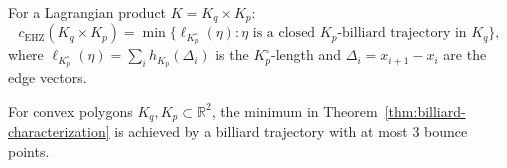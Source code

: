 \begin{unverified}
\begin{theorem}%
\label{thm:billiard-characterization}
For a Lagrangian product $K = K_q \times K_p$:
\[
  c_{\mathrm{EHZ}}(K_q \times K_p)
  = \min\bigl\{ \ell_{K_p^\circ}(\eta) :
  \eta \text{ is a closed $K_p$-billiard trajectory in } K_q \bigr\},
\]
where $\ell_{K_p^\circ}(\eta) = \sum_i h_{K_p}(\Delta_i)$ is the
$K_p^\circ$-length and $\Delta_i = x_{i+1} - x_i$ are the edge vectors.
\end{theorem}
\end{unverified}


\begin{unverified}
\begin{theorem}%
\label{thm:bounce-bound}
For convex polygons $K_q, K_p \subset \mathbb{R}^2$,
the minimum in Theorem~\ref{thm:billiard-characterization}
is achieved by a billiard trajectory with at most $3$ bounce points.
\end{theorem}
\end{unverified}


